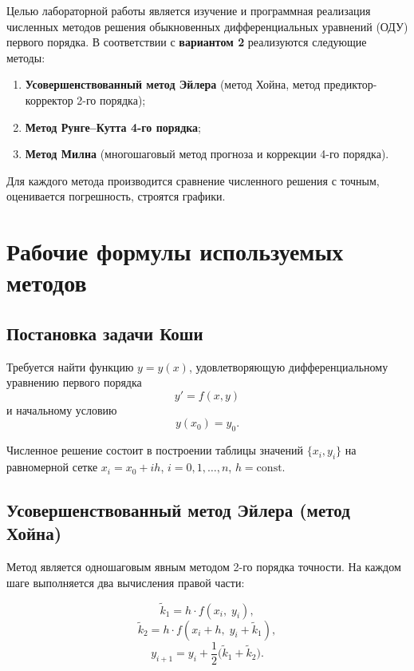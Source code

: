 \documentclass[a4paper,12pt]{article}
\begin{document}
Целью лабораторной работы является изучение и программная реализация численных методов
решения обыкновенных дифференциальных уравнений (ОДУ) первого порядка.
В соответствии с \textbf{вариантом 2} реализуются следующие методы:

\begin{enumerate}
    \item \textbf{Усовершенствованный метод Эйлера} (метод Хойна, метод предиктор-корректор 2-го порядка);
    \item \textbf{Метод Рунге--Кутта 4-го порядка};
    \item \textbf{Метод Милна} (многошаговый метод прогноза и коррекции 4-го порядка).
\end{enumerate}

Для каждого метода производится сравнение численного решения с точным,
оценивается погрешность, строятся графики.

\section{Рабочие формулы используемых методов}

\subsection{Постановка задачи Коши}

Требуется найти функцию $y = y(x)$, удовлетворяющую дифференциальному уравнению
первого порядка
\begin{equation}
    y' = f(x, y)
\end{equation}
и начальному условию
\begin{equation}
    y(x_0) = y_0.
\end{equation}

Численное решение состоит в построении таблицы значений $\{x_i, y_i\}$ на равномерной
сетке $x_i = x_0 + ih$, $i = 0, 1, \ldots, n$, $h = \mathrm{const}$.

\subsection{Усовершенствованный метод Эйлера (метод Хойна)}

Метод является одношаговым явным методом 2-го порядка точности.
На каждом шаге выполняется два вычисления правой части:

\begin{equation}
    \tilde{k}_1 = h \cdot f(x_i,\; y_i),
\end{equation}
\begin{equation}
    \tilde{k}_2 = h \cdot f(x_i + h,\; y_i + \tilde{k}_1),
\end{equation}
\begin{equation}
    \boxed{y_{i+1} = y_i + \dfrac{1}{2}\bigl(\tilde{k}_1 + \tilde{k}_2\bigr)}.
\end{equation}
\end{document}
